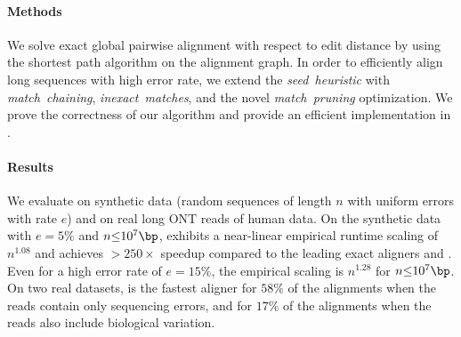 \paragraph{Methods}
We solve exact global pairwise alignment with respect to edit distance by using
the \A shortest path algorithm on the alignment graph. In order to efficiently
align long sequences with high error rate, we extend the \emph{seed~heuristic}
with \emph{match~chaining}, \emph{inexact~matches}, and the novel
\emph{match~pruning} optimization. We prove the correctness of our algorithm and
provide an efficient implementation in \astarpa.
\paragraph{Results}
We evaluate \astarpa on synthetic data (random sequences of length $n$ with
uniform errors with rate $e$) and on real long ONT reads of human data. On the
synthetic data with $e{=}5\%$ and $n{\leq}10^7\bp$, \astarpa exhibits a
near-linear empirical runtime scaling of $n^{1.08}$ and achieves ${>}250\times$
speedup compared to the leading exact aligners \edlib and \wfa. Even for a high
error rate of $e{=}15\%$, the empirical scaling is $n^{1.28}$ for
$n{\leq}10^7\bp$. On two real datasets, \astarpa is the fastest aligner for
$58\%$ of the alignments when the reads contain only sequencing errors, and for
$17\%$ of the alignments when the reads also include biological variation.